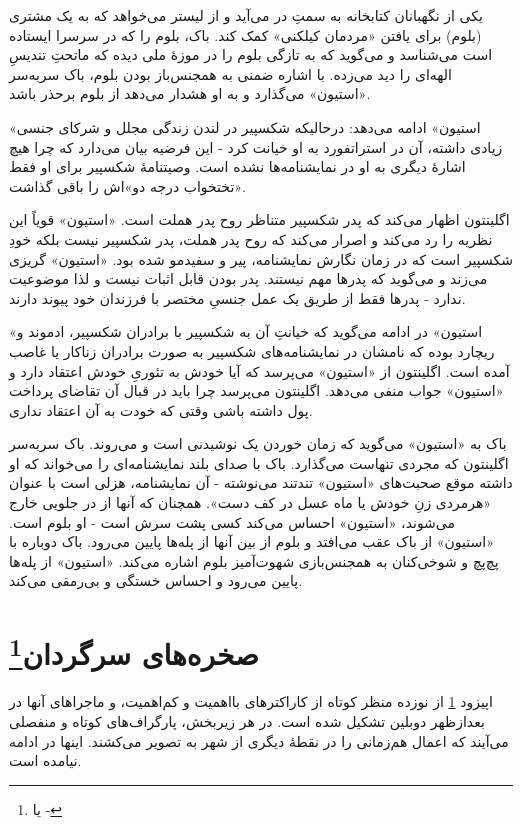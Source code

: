 \documentclass[12pt]{book}
\newcommand{\noun}[1]{«{#1}»}
\begin{document}
    یکی از نگهبانان کتابخانه به سمتِ در می‌آید و از لیستر می‌خواهد که به یک مشتری (بلوم) برای یافتن «مردمان کیلکنی» کمک کند. باک، بلوم را که در سرسرا ایستاده است می‌شناسد و می‌گوید که به تازگی بلوم را در موزۀ ملی دیده که ماتحتِ تندیسِ الهه‌ای را دید می‌زده. با اشاره ضمنی به همجنس‌باز بودن بلوم، باک سربه‌سر \noun{استیون} می‌گذارد و به او هشدار می‌دهد از بلوم برحذر باشد.

    \noun{استیون} ادامه می‌دهد: درحالیکه شکسپیر در لندن زندگی مجلل و شرکای جنسی زیادی داشته، آن در استراتفورد به او خیانت کرد - این فرضیه بیان می‌دارد که چرا هیچ اشارۀ دیگری به او در نمایشنامه‌ها نشده است. وصیتنامۀ شکسپیر برای او فقط «تختخواب درجه دو»اش را باقی گذاشت.

    اگلینتون اظهار می‌کند که پدر شکسپیر متناظر روح پدر هملت است. \noun{استیون} قویاً این نظریه را رد می‌کند و اصرار می‌کند که روح پدر هملت، پدر شکسپیر نیست بلکه خودِ شکسپیر است که در زمان نگارش نمایشنامه، پیر و سفیدمو شده بود. \noun{استیون} گریزی می‌زند و می‌گوید که پدرها مهم نیستند. پدر بودن قابل اثبات نیست و لذا موضوعیت ندارد - پدرها فقط از طریق یک عمل جنسیِ مختصر با فرزندان خود پیوند دارند.

    \noun{استیون} در ادامه می‌گوید که خیانتِ آن به شکسپیر با برادران شکسپیر، ادموند و ریچارد بوده که نامشان در نمایشنامه‌های شکسپیر به صورت برادران زناکار یا غاصب آمده است. اگلینتون از \noun{استیون} می‌پرسد که آیا خودش به تئوریِ خودش اعتقاد دارد و \noun{استیون} جواب منفی می‌دهد. اگلینتون می‌پرسد چرا باید در قبال آن تقاضای پرداخت پول داشته باشی وقتی که خودت به آن اعتقاد نداری.

    باک به \noun{استیون} می‌گوید که زمان خوردن یک نوشیدنی است و می‌روند. باک سربه‌سر اگلینتون که مجردی تنهاست می‌گذارد. باک با صدای بلند نمایشنامه‌ای را می‌خواند که او داشته موقع صحبت‌های \noun{استیون} تندتند می‌نوشته - آن نمایشنامه، هزلی است با عنوان «هرمردی زنِ خودش یا ماه عسل در کف دست». همچنان که آنها از در جلویی خارج می‌شوند، \noun{استیون} احساس می‌کند کسی پشت سرش است - او بلوم است. \noun{استیون} از باک عقب می‌افتد و بلوم از بین آنها از پله‌ها پایین می‌رود. باک دوباره با پچ‌پچ و شوخی‌کنان به همجنس‌بازی شهوت‌آمیز بلوم اشاره می‌کند. \noun{استیون} از پله‌ها پایین می‌رود و احساس خستگی و بی‌رمقی می‌کند.

    \chapter[صخره‌های سرگردان]{صخره‌های سرگردان\protect\footnote{ یا -}}\label{ep:10}
    اپیزود \ref{ep:10} از نوزده منظر کوتاه از کاراکترهای بااهمیت و کم‌اهمیت، و ماجراهای آنها در بعدازظهر دوبلین تشکیل شده است. در هر زیربخش، پارگراف‌های کوتاه و منفصلی می‌آیند که اعمال هم‌زمانی را در نقطۀ دیگری از شهر به تصویر می‌کشند. اینها در ادامه نیامده است.
\end{document}

